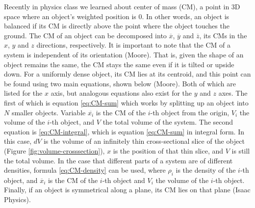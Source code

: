 \documentclass[11pt]{article}
\begin{document}
    Recently in physics class we learned about center of mass (CM), a point in $3$D space where an object's weighted position is $0$. In other words, an object is balanced if its CM is directly above the point where the object touches the ground. The CM of an object can be decomposed into $\overline{x}$, $\overline{y}$ and $\overline{z}$, its CMs in the $x$, $y$ and $z$ directions, respectively. It is important to note that the CM of a system is independent of its orientation (Moore). That is, given the shape of an object remains the same, the CM stays the same even if it is tilted or upside down. For a uniformly dense object, its CM lies at its centroid, and this point can be found using two main equations, shown below (Moore). Both of which are listed for the $x$ axis, but analogous equations also exist for the $y$ and $z$ axes. The first of which is equation \eqref{eq:CM-sum} which works by splitting up an object into $N$ smaller objects. Variable $\overline{x_i}$ is the CM of the $i$-th object from the origin, $V_i$ the volume of the $i$-th object, and $V$ the total volume of the system. The second equation is \eqref{eq:CM-integral}, which is equation \eqref{eq:CM-sum} in integral form. In this case, $dV$ is the volume of an infinitely thin cross-sectional slice of the object (Figure \ref{fig:volume-crosssection}), $x$ is the position of that thin slice, and $V$ is still the total volume. In the case that different parts of a system are of different densities, formula \eqref{eq:CM-density} can be used, where $\rho_i$ is the density of the $i$-th object, and $\overline{x}_i$ is the CM of the $i$-th object and $V_i$ the volume of the $i$-th object. Finally, if an object is symmetrical along a plane, its CM lies on that plane (Isaac Physics).
\end{document}
